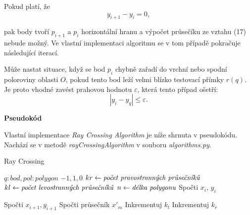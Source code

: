 \par Pokud platí, že 
\begin{equation}y_{i+1} - y_i = 0,\end{equation}
\par pak body tvoří $p_{i+1}$ a $p_i$ horizontální hranu a výpočet průsečíku ze vztahu (17) nebude možný. Ve vlastní implementaci algoritmu se v tom případě pokračuje následující iterací.
\par Může nastat situace, když se bod $p_i$ chybně zařadí do vrchní nebo spodní poloroviny oblasti $O$, pokud tento bod leží velmi blízko testovací přímky $r(q)$. Je proto vhodné zavést prahovou hodnotu $\varepsilon$, která tento případ ošetří:
\begin{equation}|y_i - y_q| \leq \varepsilon.\end{equation}

\par {\large\textbf{Pseudokód} }
\par Vlastní implementace \emph{Ray Crossing Algorithm} je níže shrnuta v pseudokódu. Nachází se v metodě \emph{rayCrossingAlgorithm} v souboru \emph{algorithms.py}.

\bigbreak

\begin{algorithm}[h]
\caption{ Ray Crossing}\label{alg:cap}
\begin{algorithmic}
\Require $q: bod, pol: polygon$
\Ensure $-1 ,1 ,0$
\State $kr \gets {\text{\emph{počet pravostranných průsečníků}}}$
\State $kl \gets {\text{\emph{počet levostranných průsečníků}}}$ 
\State $n \gets {\text{\emph{délka polygonu}}}$
    \State Spočti $x_i$, $y_i$
     
    \EndIf

    \State Spočti $x_{i+1}, y_{i+1}$
     
    \EndIf
    \State Spočti průsečník $x'_m$
     
         
         \State Inkrementuj $k_l$
        \EndIf
    \EndIf
     
         
         \State Inkrementuj $k_r$
        \EndIf
    \EndIf
\EndFor

      
      
\Else{}
      
\EndIf
\end{algorithmic}
\end{algorithm}